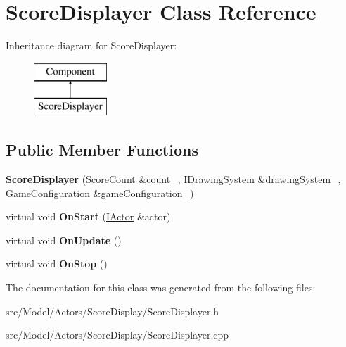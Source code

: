 \hypertarget{classScoreDisplayer}{}\section{Score\+Displayer Class Reference}
\label{classScoreDisplayer}
Inheritance diagram for Score\+Displayer\+:\begin{figure}[H]
\begin{center}
\leavevmode
\includegraphics[height=2.000000cm]{classScoreDisplayer}
\end{center}
\end{figure}
\subsection*{Public Member Functions}
\begin{DoxyCompactItemize}
\item 
{\bfseries Score\+Displayer} (\hyperlink{classScoreCount}{Score\+Count} \&count\+\_\+, \hyperlink{classIDrawingSystem}{I\+Drawing\+System} \&drawing\+System\+\_\+, \hyperlink{classGameConfiguration}{Game\+Configuration} \&game\+Configuration\+\_\+)\hypertarget{classScoreDisplayer_aefe43a77c30a2b596396792b3d9c1a8d}{}\label{classScoreDisplayer_aefe43a77c30a2b596396792b3d9c1a8d}

\item 
virtual void {\bfseries On\+Start} (\hyperlink{classIActor}{I\+Actor} \&actor)\hypertarget{classScoreDisplayer_ac411ed2e116b56ee72a4fee3737f0e30}{}\label{classScoreDisplayer_ac411ed2e116b56ee72a4fee3737f0e30}

\item 
virtual void {\bfseries On\+Update} ()\hypertarget{classScoreDisplayer_a6cef6efe83275d4248d7f0570a487732}{}\label{classScoreDisplayer_a6cef6efe83275d4248d7f0570a487732}

\item 
virtual void {\bfseries On\+Stop} ()\hypertarget{classScoreDisplayer_a254e5aa78f1eb97af233e8c452aff5fc}{}\label{classScoreDisplayer_a254e5aa78f1eb97af233e8c452aff5fc}

\end{DoxyCompactItemize}


The documentation for this class was generated from the following files\+:\begin{DoxyCompactItemize}
\item 
src/\+Model/\+Actors/\+Score\+Display/Score\+Displayer.\+h\item 
src/\+Model/\+Actors/\+Score\+Display/Score\+Displayer.\+cpp\end{DoxyCompactItemize}
